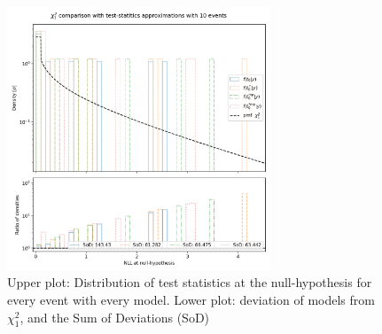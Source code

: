 \documentclass[14pt, a4paper]{article}  %
\begin{document}
\begin{figure}[!ht]
	\centering
        \includegraphics[width=0.7\textwidth]{OLD/NLL_densities.png}\caption{Upper plot: Distribution of test statistics at the null-hypothesis for every event with every model. Lower plot: deviation of models from $\chi^2_1$, and the Sum of Deviations (SoD) }\label{fig:example_chisqr_10}
\end{figure} 
\clearpage
\end{document}
